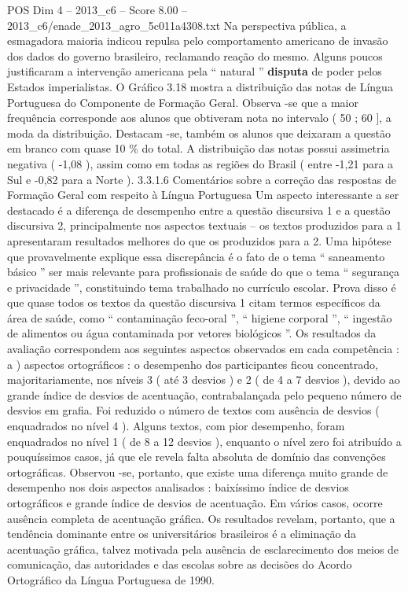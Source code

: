 \begin{textsample}{POS Dim 4 – 2013\_c6 – Score 8.00 – 2013\_c6/enade\_2013\_agro\_5c011a4308.txt}
Na perspectiva pública, a esmagadora maioria indicou repulsa pelo comportamento americano de invasão dos dados do governo brasileiro, reclamando reação do mesmo.
Alguns poucos justificaram a intervenção americana pela “ natural ” \textbf{disputa} de poder pelos Estados imperialistas.
O Gráfico 3.18 mostra a distribuição das notas de Língua Portuguesa do Componente de Formação Geral.
Observa -se que a maior frequência corresponde aos alunos que obtiveram nota no intervalo ( 50 ; 60 ], a moda da distribuição.
Destacam -se, também os alunos que deixaram a questão em branco com quase 10 \% do total.
A distribuição das notas possui assimetria negativa ( -1,08 ), assim como em todas as regiões do Brasil ( entre -1,21 para a Sul e -0,82 para a Norte ). 3.3.1.6 Comentários sobre a correção das respostas de Formação Geral com respeito à Língua Portuguesa Um aspecto interessante a ser destacado é a diferença de desempenho entre a questão discursiva 1 e a questão discursiva 2, principalmente nos aspectos textuais – os textos produzidos para a 1 apresentaram resultados melhores do que os produzidos para a 2.
Uma hipótese que provavelmente explique essa discrepância é o fato de o tema “ saneamento básico ” ser mais relevante para profissionais de saúde do que o tema “ segurança e privacidade ”, constituindo tema trabalhado no currículo escolar.
Prova disso é que quase todos os textos da questão discursiva 1 citam termos específicos da área de saúde, como “ contaminação feco-oral ”, “ higiene corporal ”, “ ingestão de alimentos ou água contaminada por vetores biológicos ”.
Os resultados da avaliação correspondem aos seguintes aspectos observados em cada competência : a ) aspectos ortográficos : o desempenho dos participantes ficou concentrado, majoritariamente, nos níveis 3 ( até 3 desvios ) e 2 ( de 4 a 7 desvios ), devido ao grande índice de desvios de acentuação, contrabalançada pelo pequeno número de desvios em grafia.
Foi reduzido o número de textos com ausência de desvios ( enquadrados no nível 4 ).
Alguns textos, com pior desempenho, foram enquadrados no nível 1 ( de 8 a 12 desvios ), enquanto o nível zero foi atribuído a pouquíssimos casos, já que ele revela falta absoluta de domínio das convenções ortográficas.
Observou -se, portanto, que existe uma diferença muito grande de desempenho nos dois aspectos analisados : baixíssimo índice de desvios ortográficos e grande índice de desvios de acentuação.
Em vários casos, ocorre ausência completa de acentuação gráfica.
Os resultados revelam, portanto, que a tendência dominante entre os universitários brasileiros é a eliminação da acentuação gráfica, talvez motivada pela ausência de esclarecimento dos meios de comunicação, das autoridades e das escolas sobre as decisões do Acordo Ortográfico da Língua Portuguesa de 1990.

\end{textsample}
